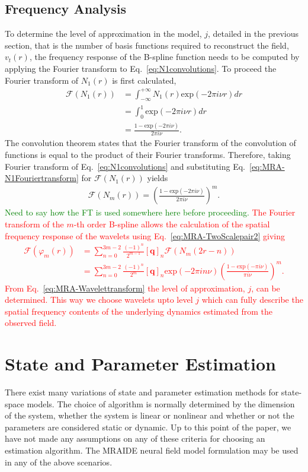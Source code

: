\documentclass[review,authoryear,3p]{elsarticle}
\newcommand{\dean}[1]{\textcolor{green}{#1}}
\newcommand{\parham}[1]{\textcolor{red}{#1}}
\begin{document}
\subsection{Frequency Analysis}
To determine the level of approximation in the model, $j$, detailed in the previous section, that is the number of basis functions required to reconstruct the field, $v_t(r)$, the frequency response of the B-spline function needs to be computed by applying the Fourier transform to Eq.~\eqref{eq:N1convolutions}. To proceed the Fourier transform of $N_1(r)$ is first calculated, 
\begin{align}\label{eq:MRA-N1Fouriertransform}
\mathcal F(N_1(r))&=\int_{-\infty}^{+\infty}N_1(r)\mathrm{exp}(-2\pi i \nu r)dr \nonumber \\
&=\int_{0}^{1} \mathrm{exp}(-2\pi i \nu r)dr \nonumber \\
&=\frac{1-\mathrm{exp}(-2\pi i \nu)}{2\pi i\nu}.
\end{align}
The convolution theorem states that the Fourier transform of the convolution of functions is equal to the product of their Fourier transforms. Therefore, taking Fourier transform of Eq.~\eqref{eq:N1convolutions} and substituting Eq.~\eqref{eq:MRA-N1Fouriertransform} for $\mathcal F(N_1(r)) $ yields
\begin{align}\label{eq:MRA-NmFouriertransform}
\mathcal F(N_m(r))=\left(\frac{1-\mathrm{exp}(-2\pi i \nu)}{2\pi i\nu}\right)^m.
\end{align}
\dean{Need to say how the FT is used somewhere here before proceeding.} \parham{The Fourier transform of the $m$-th order B-spline allows the calculation of the spatial frequency response of the wavelets using Eq.~\eqref{eq:MRA-TwoScalepair2} giving
\begin{align}      
	  \mathcal{F}(\varphi_{m}\left(r\right)) &= \sum_{n=0}^{3m-2} \frac{\left(-1\right)^n}{2^{m-1}} \left[\mathbf q\right]_n \mathcal{F}\left(N_{m}\left(2r-n\right)\right) \nonumber\\
	&=\sum_{n=0}^{3m-2} \frac{\left(-1\right)^n}{2^{m}} \left[\mathbf q\right]_n \mathrm{exp}(-2\pi in\nu)\left(\frac{1-\mathrm{exp}(-\pi i \nu)}{\pi i\nu}\right)^m.\label{eq:MRA-Wavelettransform}
\end{align}
 From Eq.~\eqref{eq:MRA-Wavelettransform} the level of approximation, $j$, can be determined. This way we choose wavelets upto level $j$ which can fully describe the spatial frequency contents of the underlying dynamics estimated from the observed field.}
\section{State and Parameter Estimation}
There exist many variations of state and parameter estimation methods for state-space models. The choice of algorithm is normally determined by the dimension of the system, whether the system is linear or nonlinear and whether or not the parameters are considered static or dynamic. Up to this point of the paper, we have not made any assumptions on any of these criteria for choosing an estimation algorithm. The MRAIDE neural field model formulation may be used in any of the above scenarios. 
\end{document}
